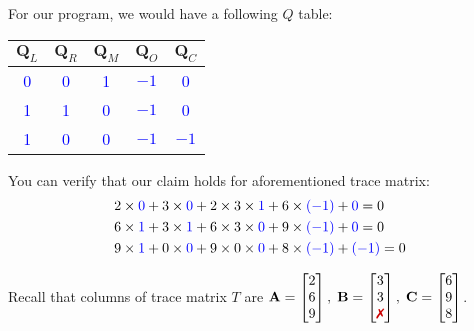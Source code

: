 \documentclass[../lecture-notes-148x210.tex]{subfiles}
\begin{document}
\begin{example}

For our program, we would have a following $Q$ table:
\begin{center}
\begin{tabular}{|c|c|c|c|c|}
\hline
\rowcolor{gray!30}$\mathbf{Q}_L$ & $\mathbf{Q}_R$ & $\mathbf{Q}_M$ & $\mathbf{Q}_O$ & $\mathbf{Q}_C$ \\ 
\hline
\textcolor{blue}{0} & \textcolor{blue}{0} & \textcolor{blue}{1} & \textcolor{blue}{$-1$} & \textcolor{blue}{0} \\ 
\hline
\textcolor{blue}{1} & \textcolor{blue}{1} & \textcolor{blue}{0} & \textcolor{blue}{$-1$} & \textcolor{blue}{0} \\ 
\hline
\textcolor{blue}{1} & \textcolor{blue}{0} & \textcolor{blue}{0} & \textcolor{blue}{$-1$} & \textcolor{blue}{$-1$} \\ 
\hline
\end{tabular}
\end{center}

You can verify that our claim holds for aforementioned trace matrix:
\begin{align*}
  &2 \times \textcolor{blue}{0} + 3 \times \textcolor{blue}{0} + 2 \times 3 \times \textcolor{blue}{1} + 6 \times \textcolor{blue}{(-1)} + \textcolor{blue}{0} = 0 \\
  &6 \times \textcolor{blue}{1} + 3 \times \textcolor{blue}{1} + 6 \times 3 \times \textcolor{blue}{0} + 9 \times \textcolor{blue}{(-1)} + \textcolor{blue}{0} = 0 \\
  &9 \times \textcolor{blue}{1} + 0 \times \textcolor{blue}{0} + 9 \times 0 \times \textcolor{blue}{0} + 8 \times \textcolor{blue}{(-1)} + \textcolor{blue}{(-1)} = 0 
\end{align*}

Recall that columns of trace matrix $T$ are $\mathbf{A} = \begin{bmatrix} 2 \\ 6 \\ 9 \end{bmatrix}, \;\mathbf{B} = \begin{bmatrix} 3 \\ 3 \\ \text{\xmark} \end{bmatrix}, \;\mathbf{C} = \begin{bmatrix} 6 \\ 9 \\ 8 \end{bmatrix}$.

\end{example}
\end{document}
